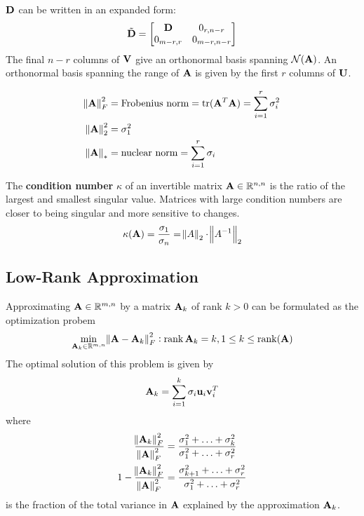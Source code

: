 $\mathbf{D}$ can be written in an expanded form:
\begin{equation}
\tilde {\mathbf{D}}=
\begin{bmatrix}
\mathbf{D}       & 0_{r,n-r}   \\
0_{m-r,r} & 0_{m-r,n-r}
\end{bmatrix}
\end{equation}
The final $n-r$ columns of $\mathbf{V}$ give an orthonormal basis spanning $\mathcal{N}(\mathbf{A})$. An orthonormal basis spanning the range of $\mathbf{A}$ is given by the first $r$ columns of $\mathbf{U}$.

\begin{align}
\norm{\mathbf{A}}^2_F&=\textrm{Frobenius norm} =\operatorname{tr}(\mathbf{A}^T\mathbf{A})=\sum_{i=1}^r \sigma_i^2 \\
\norm{\mathbf{A}}^2_2&=\sigma_1^2 \\
\norm{\mathbf{A}}_* &= \textrm{nuclear norm}=\sum_{i=1}^r \sigma_i
\end{align}

The \textbf{condition number} $\kappa$ of an invertible matrix $\mathbf{A}\in\mathbb{R}^{n,n}$ is the ratio of the largest and smallest singular value. Matrices with large condition numbers are closer to being singular and more sensitive to changes.
\begin{equation}
\kappa(\mathbf{A})=\frac{\sigma_1}{\sigma_n}=\norm{A}_2 \cdot \norm{A^{-1}}_2
\end{equation}

\subsection*{Low-Rank Approximation}
Approximating $\mathbf{A}\in\mathbb{R}^{m,n}$ by a matrix $\mathbf{A}_k$ of rank $k>0$ can be formulated as the optimization probem
\begin{equation}
\min_{\mathbf{A}_k\in\mathbb{R}^{m,n}} \norm{\mathbf{A}-\mathbf{A}_k}_F^2: \operatorname{rank}{\mathbf{A}_k}=k, 1\le k \le \operatorname{rank}(\mathbf{A})
\end{equation}
The optimal solution of this problem is given by
\begin{equation}
\mathbf{A}_k=\sum_{i=1}^k \sigma_i \mathbf{u}_i \mathbf{v}_i^T
\end{equation}
where
\begin{align}
\frac{\norm{\mathbf{A}_k}_F^2}{\norm{\mathbf{A}}_F^2}&=\frac{\sigma_1^2+\ldots+\sigma_k^2}{\sigma_1^2+\ldots+\sigma_r^2} \\
1-\frac{\norm{\mathbf{A}_k}_F^2}{\norm{\mathbf{A}}_F^2}&=\frac{\sigma_{k+1}^2+\ldots+\sigma_r^2}{\sigma_1^2+\ldots+\sigma_r^2} 
\end{align}
is the fraction of the total variance in $\mathbf{A}$ explained by the approximation $\mathbf{A}_k$.

